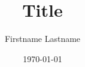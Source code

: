 \documentclass[aspectratio=43]{beamer}
\title{Title}
\author{Firstname Lastname}
\subtitle{}
\date{\today}
\institute{Lund University\\Institutionen för Datavetenskap}
\begin{document}
\titleframe

\begin{frame}{}
\end{frame}
\end{document}
